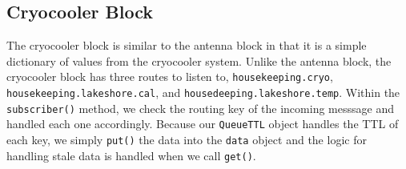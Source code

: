 \subsection{Cryocooler Block}
The cryocooler block is similar to the antenna block in that it is a simple dictionary of values from the cryocooler system.
Unlike the antenna block, the cryocooler block has three routes to listen to, \texttt{housekeeping.cryo}, \texttt{housekeeping.lakeshore.cal}, and \texttt{housedeeping.lakeshore.temp}.
Within the \texttt{subscriber()} method, we check the routing key of the incoming messsage and handled each one accordingly. 
Because our \texttt{QueueTTL} object handles the TTL of each key, we simply \texttt{put()} the data into the \texttt{data} object and the logic for handling stale data is handled when we call \texttt{get()}. 

